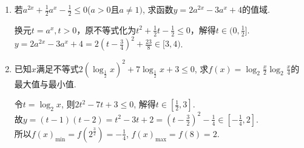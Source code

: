 \begin{enumerate}
    \begin{jieda}
    令$t=2^x+2^{-x}\in[2,+\infty)$, 则
    $y = 3t^2-20t-6 = 3(t-\frac{10}{3})^2-\frac{118}{3}$ \\
    故$y_{\min}=-\frac{118}{3}$, 当$t=\frac{10}{3}$即$2^x = \frac{1}{3}\mbox{或}3, x=log_23 \mbox{或}-log_23$时取到. 
    \end{jieda}
    \begin{vspace_}
    \vsp[5]
    \end{vspace_}
    \item 若$a^{2x}+\frac{1}{2}a^x-\frac{1}{2}\leq 0$($a>0$且$a\neq 1)$, 求函数$y=2a^{2x}-3a^x+4$的值域. 
    \begin{jieda}
    换元$t = a^x, t > 0$，原不等式化为$t^2+\frac{1}{2}t-\frac{1}{2}\leq 0$，解得$t\in(0,\frac{1}{2}]$. \\
    $y=2a^{2x}-3a^x+4=2(t-\frac{3}{4})^2+\frac{23}{8}\in[3,4)$. 
    \end{jieda}
    \begin{vspace_}
    \vsp[5]
    \end{vspace_}
    \item 已知$x$满足不等式$2(\log_{\frac{1}{2}}x)^2+7\log_{\frac{1}{2}}x+3\leq 0$, 
    求$f(x)=\log_2\frac{x}{2}\log_2\frac{x}{4}$的最大值与最小值.
    \begin{jieda}
    令$t=\log_2x$, 则$2t^2-7t+3\leq 0$, 解得$t\in[\frac{1}{2},3]$. \\
    故$y=(t-1)(t-2)=t^2-3t+2=(t-\frac{3}{2})^2-\frac{1}{4}\in[-\frac{1}{4},2]$. \\
    所以$f(x)_{\min}=f(2^{\frac{3}{2}})=-\frac{1}{4}$, $f(x)_{\max}=f(8)=2$. 
    \end{jieda}
\end{enumerate}